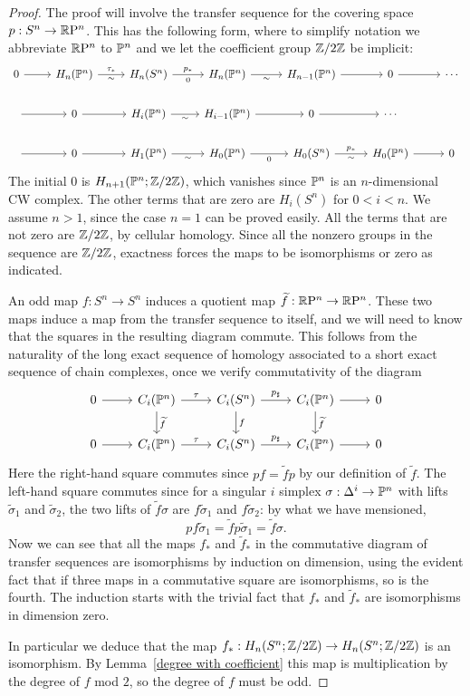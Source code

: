 \begin{proof}
The proof will involve the transfer sequence for the covering space $p:S^n\to\RP^n$. This has the following form, where to simplify notation we abbreviate $\RP^n$ to $\P^n$ and we let the coefficient group $\Z/2\Z$ be implicit:
\[\begin{tikzcd}
0\ar[r]&H_n(\P^n)\ar[r,"\tau_*","\sim"']&H_n(S^n)\ar[r,"p_*","0"']&H_n(\P^n)\ar[r,swap,"\sim"]&H_{n-1}(\P^n)\ar[r]&0\ar[r]&\cdots\\
{}\ar[r]&0\ar[r]&H_i(\P^n)\ar[r,swap,"\sim"]&H_{i-1}(\P^n)\ar[r]&0\ar[r]&\cdots\\
{}\ar[r]&0\ar[r]&H_1(\P^n)\ar[r,swap,"\sim"]&H_0(\P^n)\ar[r,swap,"0"]&H_0(S^n)\ar[r,"p_*","\sim"']&H_0(\P^n)\ar[r]&0
\end{tikzcd}\]
The initial $0$ is $H_{n+1}(\P^n;\Z/2\Z)$, which vanishes since $\P^n$ is an $n$-dimensional CW complex. The other terms that are zero are $H_i(S^n)$ for $0<i<n$. We assume $n>1$, since the case $n=1$ can be proved easily. All the terms that are not zero are $\Z/2\Z$, by cellular homology. Since all the nonzero groups in the sequence are $\Z/2\Z$, exactness forces the maps to be isomorphisms or zero as indicated.\par
An odd map $f:S^n\to S^n$ induces a quotient map $\widetilde{f}:\RP^n\to\RP^n$. These two maps induce a map from the transfer sequence to itself, and we will need to know that the squares in the resulting diagram commute. This follows from the naturality of the long exact sequence of homology associated to a short exact sequence of chain complexes, once we verify commutativity of the diagram
\[\begin{tikzcd}
0\ar[r]&C_i(\P^n)\ar[d,"\widetilde{f}"]\ar[r,"\tau"]&C_i(S^n)\ar[d,"f"]\ar[r,"p_\sharp"]&C_i(\P^n)\ar[d,"\widetilde{f}"]\ar[r]&0\\
0\ar[r]&C_i(\P^n)\ar[r,"\tau"]&C_i(S^n)\ar[r,"p_\sharp"]&C_i(\P^n)\ar[r]&0
\end{tikzcd}\]
Here the right-hand square commutes since $pf=\widetilde{f}p$ by our definition of $\widetilde{f}$. The left-hand square commutes since for a singular $i$ simplex $\sigma:\Delta^i\to\P^n$ with lifts $\widetilde{\sigma}_1$ and $\widetilde{\sigma}_2$, the two lifts of $\widetilde{f}\sigma$ are $f\widetilde{\sigma}_1$ and $f\widetilde{\sigma}_2$: by what we have mensioned,
\[pf\widetilde{\sigma}_1=\widetilde{f}p\widetilde{\sigma}_1=\widetilde{f}\sigma.\]
Now we can see that all the maps $f_*$ and $\widetilde{f}_*$ in the commutative diagram of transfer sequences are isomorphisms by induction on dimension, using the evident fact that if three maps in a commutative square are isomorphisms, so is the fourth. The induction starts with the trivial fact that $f_*$ and $\widetilde{f}_*$ are isomorphisms in dimension zero.\par
In particular we deduce that the map $f_*:H_n(S^n;\Z/2\Z)\to H_n(S^n;\Z/2\Z)$ is an isomorphism. By Lemma~\ref{degree with coefficient} this map is multiplication by the degree of $f$ mod $2$, so the degree of $f$ must be odd.
\end{proof}
